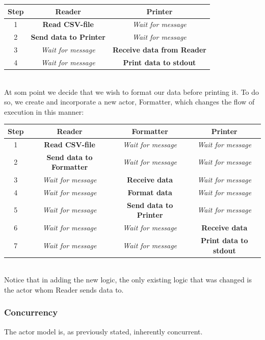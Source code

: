 \begin{tabular}{ | c | c | c | }
\hline
Step & Reader & Printer \\\hline
1 & \textbf{Read CSV-file} & \textit{Wait for message} \\\hline
2 & \textbf{Send data to Printer} & \textit{Wait for message}\\\hline
3 & \textit{Wait for message} & \textbf{Receive data from Reader}\\\hline
4 & \textit{Wait for message} & \textbf{Print data to stdout}\\\hline
\end{tabular}\\
At som point we decide that we wish to format our data before printing it. To do so, we create and incorporate a new actor, Formatter, which changes the flow of execution in this manner:

\begin{tabular}{ | c | c | c | c | }
\hline
Step & Reader & Formatter & Printer \\\hline
1 & \textbf{Read CSV-file} & \textit{Wait for message} & \textit{Wait for message} \\\hline
2 & \textbf{Send data to Formatter} & \textit{Wait for message} & \textit{Wait for message}\\\hline
3 & \textit{Wait for message} & \textbf{Receive data} & \textit{Wait for message} \\\hline
4 & \textit{Wait for message} & \textbf{Format data} & \textit{Wait for message} \\\hline
5 & \textit{Wait for message} & \textbf{Send data to Printer} & \textit{Wait for message} \\\hline
6 & \textit{Wait for message} & \textit{Wait for message} & \textbf{Receive data}\\\hline
7 & \textit{Wait for message} & \textit{Wait for message} & \textbf{Print data to stdout} \\\hline
\end{tabular}\\

Notice that in adding the new logic, the only existing logic that was changed is the actor whom Reader sends data to.

\subsubsection{Concurrency}
The actor model is, as previously stated, inherently concurrent.

